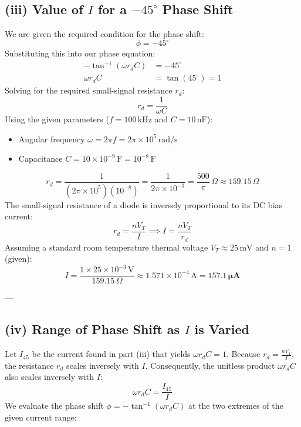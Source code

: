 \documentclass[12pt,a3paper]{article}
\begin{document}
\begin{enumerate}
\begin{tcolorbox}[enhanced,breakable,ansbox,colback=cA!4,colframe=cA,boxrule=0.8pt,arc=5pt,title={\textbf{Answer}},fonttitle=\bfseries\color{white},colbacktitle=cA]
\subsection*{(iii) Value of $I$ for a $-45^\circ$ Phase Shift}
We are given the required condition for the phase shift:
\begin{equation}
    \phi = -45^\circ
\end{equation}
Substituting this into our phase equation:
\begin{align}
    -\tan^{-1}(\omega r_d C) &= -45^\circ \\[6pt]
    \omega r_d C &= \tan(45^\circ) = 1
\end{align}
Solving for the required small-signal resistance $r_d$:
\begin{equation}
    r_d = \frac{1}{\omega C}
\end{equation}
Using the given parameters ($f = 100\,\text{kHz}$ and $C = 10\,\text{nF}$):
\begin{itemize}
    \item Angular frequency $\omega = 2\pi f = 2\pi \times 10^5\,\text{rad/s}$
    \item Capacitance $C = 10 \times 10^{-9}\,\text{F} = 10^{-8}\,\text{F}$
\end{itemize}
\begin{equation}
    r_d = \frac{1}{(2\pi \times 10^5)(10^{-8})} = \frac{1}{2\pi \times 10^{-3}} = \frac{500}{\pi}\,\Omega \approx 159.15\,\Omega
\end{equation}
The small-signal resistance of a diode is inversely proportional to its DC bias current:
\begin{equation}
    r_d = \frac{n V_T}{I} \implies I = \frac{n V_T}{r_d}
\end{equation}
Assuming a standard room temperature thermal voltage $V_T \approx 25\,\text{mV}$ and $n=1$ (given):
\begin{equation}
    I = \frac{1 \times 25 \times 10^{-3}\,\text{V}}{159.15\,\Omega} \approx 1.571 \times 10^{-4}\,\text{A} = \mathbf{157.1\,\mu\text{A}}
\end{equation}

---

\subsection*{(iv) Range of Phase Shift as $I$ is Varied}
Let $I_{45}$ be the current found in part (iii) that yields $\omega r_d C = 1$. Because $r_d = \frac{n V_T}{I}$, the resistance $r_d$ scales inversely with $I$. Consequently, the unitless product $\omega r_d C$ also scales inversely with $I$:
\begin{equation}
    \omega r_d C = \frac{I_{45}}{I}
\end{equation}
We evaluate the phase shift $\phi = -\tan^{-1}(\omega r_d C)$ at the two extremes of the given current range:


\end{tcolorbox}
\end{enumerate}
\end{document}
